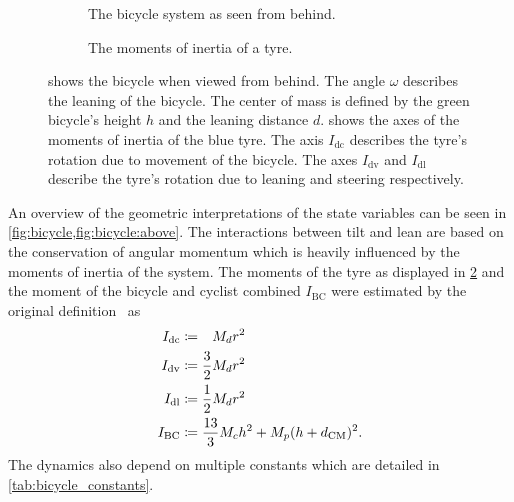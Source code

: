 \begin{figure}[p]
    \centering
    \begin{subfigure}[b]{\subfigurewidth}
        \centering
        
        \caption{
            The bicycle system as seen from behind.
        }
        \label{fig:bicycle:behind}
    \end{subfigure}
    \begin{subfigure}[b]{\subfigurewidth}
        \centering
        
        \caption{
            The moments of inertia of a tyre.
        }
        \label{fig:bicycle:inertia}
    \end{subfigure}
    \caption[The bicycle system as seen from behind and moments of inertia]{
         shows the bicycle when viewed from behind.
        The angle $\omega$ describes the leaning of the bicycle.
        The center of mass is defined by the green bicycle's height $h$ and the leaning distance $d$.
         shows the axes of the moments of inertia of the blue tyre.
        The axis $I_{\text{dc}}$ describes the tyre's rotation due to movement of the bicycle.
        The axes $I_{\text{dv}}$ and $I_{\text{dl}}$ describe the tyre's rotation due to leaning and steering respectively.
    }
    \label{fig:bicycle}
\end{figure}

An overview of the geometric interpretations of the state variables can be seen in \cref{fig:bicycle,fig:bicycle:above}.
The interactions between tilt and lean are based on the conservation of angular momentum which is heavily influenced by the moments of inertia of the system.
The moments of the tyre as displayed in \cref{fig:bicycle:inertia} and the moment of the bicycle and cyclist combined $I_{\text{BC}}$ were estimated by the original definition~\cite{randlov_learning_1998} as
\begin{align}
    I_{\text{dc}} &\coloneqq \hphantom{\frac{1}{2}}M_d r^2\\
    I_{\text{dv}} &\coloneqq \frac{3}{2}M_d r^2\\
    I_{\text{dl}} &\coloneqq \frac{1}{2}M_d r^2\\
    I_{\text{BC}} &\coloneqq \frac{13}{3} M_c h^2 + M_p(h + d_\CM)^2.
\end{align}
The dynamics also depend on multiple constants which are detailed in \cref{tab:bicycle_constants}.

